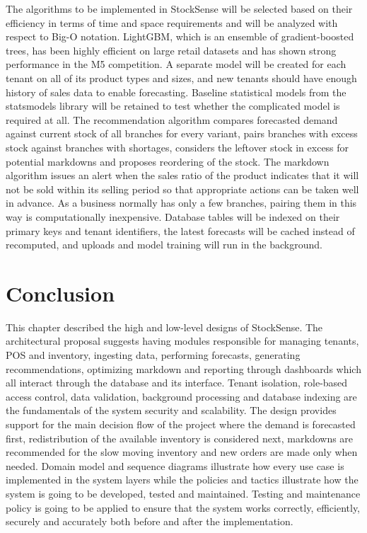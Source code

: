 \documentclass{StockSense}
\begin{document}
The algorithms to be implemented in StockSense will be selected based on their efficiency in terms of time and space requirements and will be analyzed with respect to Big-O notation. LightGBM, which is an ensemble of gradient-boosted trees, has been highly efficient on large retail datasets and has shown strong performance in the M5 competition. A separate model will be created for each tenant on all of its product types and sizes, and new tenants should have enough history of sales data to enable forecasting. Baseline statistical models from the statsmodels library will be retained to test whether the complicated model is required at all. The recommendation algorithm compares forecasted demand against current stock of all branches for every variant, pairs branches with excess stock against branches with shortages, considers the leftover stock in excess for potential markdowns and proposes reordering of the stock. The markdown algorithm issues an alert when the sales ratio of the product indicates that it will not be sold within its selling period so that appropriate actions can be taken well in advance. As a business normally has only a few branches, pairing them in this way is computationally inexpensive. Database tables will be indexed on their primary keys and tenant identifiers, the latest forecasts will be cached instead of recomputed, and uploads and model training will run in the background.

\section{Conclusion}

This chapter described the high and low-level designs of StockSense. The architectural proposal suggests having modules responsible for managing tenants, POS and inventory, ingesting data, performing forecasts, generating recommendations, optimizing markdown and reporting through dashboards which all interact through the database and its interface. Tenant isolation, role-based access control, data validation, background processing and database indexing are the fundamentals of the system security and scalability. The design provides support for the main decision flow of the project where the demand is forecasted first, redistribution of the available inventory is considered next, markdowns are recommended for the slow moving inventory and new orders are made only when needed. Domain model and sequence diagrams illustrate how every use case is implemented in the system layers while the policies and tactics illustrate how the system is going to be developed, tested and maintained. Testing and maintenance policy is going to be applied to ensure that the system works correctly, efficiently, securely and accurately both before and after the implementation.
\end{document}
